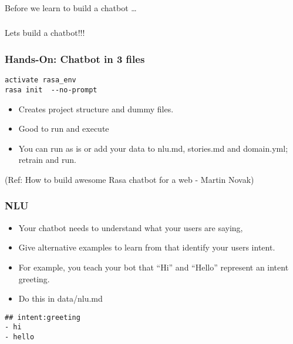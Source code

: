 \begin{frame}[fragile]\frametitle{}
\begin{center}
{\Large Before we learn to build a chatbot \ldots}
\end{center}
\end{frame}

\begin{frame}[fragile]\frametitle{}
\begin{center}
{\Large Lets build a chatbot!!!}
\end{center}
\end{frame}


 \begin{frame}[fragile]\frametitle{Hands-On: Chatbot in 3 files}

\begin{lstlisting}
activate rasa_env
rasa init  --no-prompt
\end{lstlisting}

\begin{itemize}
\item Creates project structure and dummy files. 
\item Good to run and execute
\item You can run as is or add your data to nlu.md, stories.md and domain.yml; retrain and run.
\end{itemize}

{\tiny (Ref: How to build awesome Rasa chatbot for a web - Martin Novak)}

\end{frame}

 \begin{frame}[fragile]\frametitle{NLU}

\begin{itemize}
\item Your chatbot needs to understand what your users are saying,
\item Give alternative examples to learn from that identify your users intent.
\item For example, you teach your bot that ``Hi'' and ``Hello'' represent an intent greeting. 
\item Do this in data/nlu.md
\end{itemize}


\begin{lstlisting}
## intent:greeting
- hi
- hello
\end{lstlisting}

\end{frame}


